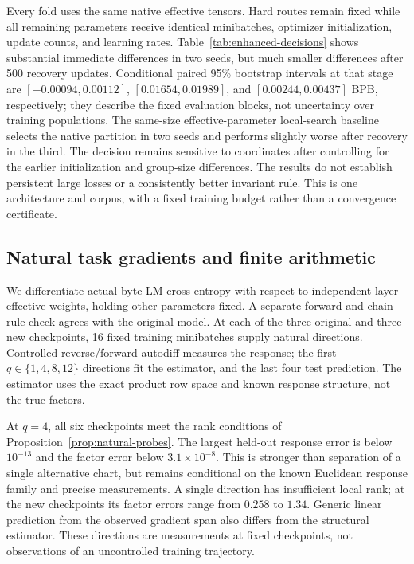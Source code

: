 

Every fold uses the same native effective tensors. Hard routes remain fixed
while all remaining parameters receive identical minibatches, optimizer
initialization, update counts, and learning rates. Table~\ref{tab:enhanced-decisions}
shows substantial immediate differences in two seeds, but much smaller
differences after 500 recovery updates. Conditional paired 95\% bootstrap
intervals at that stage are $[-0.00094,0.00112]$, $[0.01654,0.01989]$, and
$[0.00244,0.00437]$ BPB, respectively; they describe the fixed evaluation
blocks, not uncertainty over training populations. The same-size
effective-parameter local-search baseline selects the native partition in
two seeds and performs slightly worse after recovery in the third.
The decision remains sensitive to coordinates after controlling for the
earlier initialization and group-size differences. The results do not
establish persistent large losses or a consistently better invariant rule. This is one architecture and corpus,
with a fixed training budget rather than a convergence certificate.

\subsection{Natural task gradients and finite arithmetic}
\label{sec:natural-gradients}

We differentiate actual byte-LM cross-entropy with respect to independent
layer-effective weights, holding other parameters fixed. A separate forward
and chain-rule check agrees with the original model. At each of the three
original and three new checkpoints, 16 fixed training minibatches supply
natural directions. Controlled reverse/forward autodiff measures the response;
the first $q\in\{1,4,8,12\}$ directions fit the estimator, and the last four
test prediction. The estimator uses the exact product row space and known
response structure, not the true factors.



At $q=4$, all six checkpoints meet the rank conditions of
Proposition~\ref{prop:natural-probes}. The largest held-out response error is
below $10^{-13}$ and the factor error below $3.1\times10^{-8}$.
This is stronger than separation of a single alternative chart, but remains
conditional on the known Euclidean response family and precise measurements.
A single direction has insufficient local rank; at the new checkpoints its
factor errors range from $0.258$ to $1.34$. Generic linear prediction from the
observed gradient span also differs from the structural estimator. These
directions are measurements at fixed checkpoints, not observations of an
uncontrolled training trajectory.

